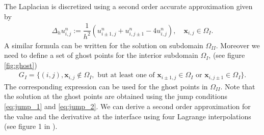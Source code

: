 \documentclass[10pt,a4paper,twoside, french]{article}
\numberwithin{equation}{section}
\numberwithin{figure}{section}
\numberwithin{table}{section}
\newcommand{\bx}{\mathbf{x}}
\begin{document}
The Laplacian is discretized using a second order accurate approximation given by 
\begin{align}
\Delta_h u_{i,j}^n := \dfrac{1}{h^2}\left( u_{i\pm1,j}^n+u_{i,j\pm1}^n-4u_{i,j}^n\right), \quad \bx_{i,j}\in\Omega_I.
\label{eq:laplace}
\end{align}
A similar formula can be written for the solution on subdomain $\Omega_{II}$. Moreover we need to define a set of ghost points for the interior subdomain $\Omega_{I}$, (see figure \ref{fig:ghost})
\begin{align}
G_I = \lbrace (i,j), \bx_{i,j}\notin \Omega_I, \text{ but at least one of } \bx_{i\pm1,j}\in\Omega_I \text{ or } \bx_{i,j\pm1}\in\Omega_I\rbrace.
\end{align}
The corresponding expression can be used for the ghost points in $\Omega_{II}$. Note that the solution at the ghost points are obtained using the jump conditions \eqref{eq:jump_1} and \eqref{eq:jump_2}. We can derive a second order approximation for the value and the derivative at the interface using four Lagrange interpolations (see figure 1 in \cite{main_paper}).

\begin{center}
\vspace{.5cm}
\begin{minipage}[c]{0.4\textwidth}
\label{fig:ghost}
\end{minipage}
\end{center}
\end{document}
